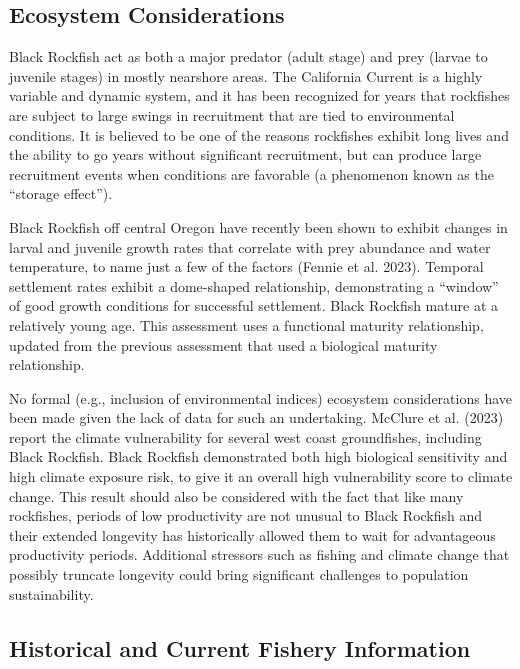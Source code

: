 \documentclass[11pt,
  english,
  letterpaper,
]{article}
\begin{document}
\hypertarget{ecosystem-considerations-1}{%
\subsection{Ecosystem Considerations}\label{ecosystem-considerations-1}}

Black Rockfish act as both a major predator (adult stage) and prey (larvae to juvenile stages) in mostly nearshore areas. The California Current is a highly variable and dynamic system, and it has been recognized for years that rockfishes are subject to large swings in recruitment that are tied to environmental conditions. It is believed to be one of the reasons rockfishes exhibit long lives and the ability to go years without significant recruitment, but can produce large recruitment events when conditions are favorable (a phenomenon known as the ``storage effect'').

Black Rockfish off central Oregon have recently been shown to exhibit changes in larval and juvenile growth rates that correlate with prey abundance and water temperature, to name just a few of the factors (Fennie et al. 2023). Temporal settlement rates exhibit a dome-shaped relationship, demonstrating a ``window'' of good growth conditions for successful settlement. Black Rockfish mature at a relatively young age. This assessment uses a functional maturity relationship, updated from the previous assessment that used a biological maturity relationship.

No formal (e.g., inclusion of environmental indices) ecosystem considerations have been made given the lack of data for such an undertaking. McClure et al. (2023) report the climate vulnerability for several west coast groundfishes, including Black Rockfish. Black Rockfish demonstrated both high biological sensitivity and high climate exposure risk, to give it an overall high vulnerability score to climate change. This result should also be considered with the fact that like many rockfishes, periods of low productivity are not unusual to Black Rockfish and their extended longevity has historically allowed them to wait for advantageous productivity periods. Additional stressors such as fishing and climate change that possibly truncate longevity could bring significant challenges to population sustainability.

\hypertarget{historical-and-current-fishery-information}{%
\subsection{Historical and Current Fishery Information}\label{historical-and-current-fishery-information}}
\end{document}
